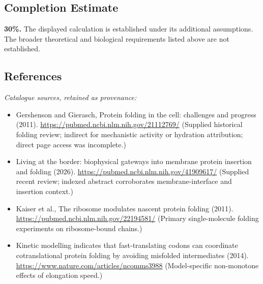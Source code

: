 \documentclass[11pt]{article}
\begin{document}
\subsection{Completion Estimate}
\textbf{30\%.} The displayed calculation is established under its additional assumptions. The broader theoretical and biological requirements listed above are not established.
\subsection{References}
\noindent\emph{Catalogue sources, retained as provenance:}
\begin{itemize}
\item Gershenson and Gierasch, Protein folding in the cell: challenges and progress (2011). \url{https://pubmed.ncbi.nlm.nih.gov/21112769/} (Supplied historical folding review; indirect for mechanistic activity or hydration attribution; direct page access was incomplete.)
\item Living at the border: biophysical gateways into membrane protein insertion and folding (2026). \url{https://pubmed.ncbi.nlm.nih.gov/41909617/} (Supplied recent review; indexed abstract corroborates membrane-interface and insertion context.)
\item Kaiser et al., The ribosome modulates nascent protein folding (2011). \url{https://pubmed.ncbi.nlm.nih.gov/22194581/} (Primary single-molecule folding experiments on ribosome-bound chains.)
\item Kinetic modelling indicates that fast-translating codons can coordinate cotranslational protein folding by avoiding misfolded intermediates (2014). \url{https://www.nature.com/articles/ncomms3988} (Model-specific non-monotone effects of elongation speed.)
\end{itemize}
\clearpage


\appendix
\end{document}
